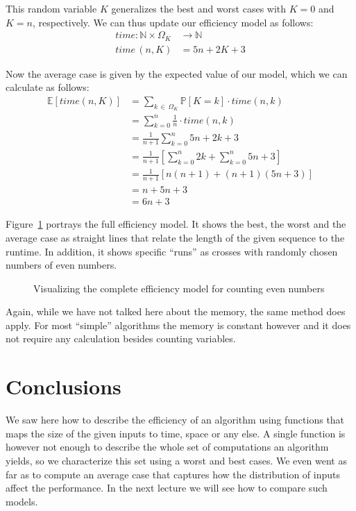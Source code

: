 \documentclass{aldast}
\begin{document}
This random variable $K$ generalizes the best and worst cases with $K=0$
and $K=n$, respectively. We can thus update our efficiency model as
follows:
\begin{align*}
  time: \mathbb{N} \times \Omega_K & \to \mathbb{N} \\
  time\,(n, K) & = 5n + 2K + 3 
\end{align*}

Now the average case is given by the expected value of our model,
which we can calculate as follows:
\begin{align*}
  \mathbb{E}[time(n, K)] & = \sum_{k \, \in \, \Omega_K} \mathbb{P}[K=k] \cdot time(n, k)  \\
                         & = \sum_{k=0}^n \frac{1}{n} \cdot time(n, k) \\
                         & = \frac{1}{n+1} \sum_{k=0}^{n} 5n + 2k + 3 \\
                         & = \frac{1}{n+1} \left[ \sum_{k=0}^{n} 2k + \sum_{k=0}^n 5n + 3 \right] \\
                         & = \frac{1}{n+1} \left[ n (n+1)  +  (n+1) (5n + 3) \right] \\
                         & = n + 5 n + 3 \\
                         & = 6n + 3
\end{align*}

Figure~\ref{plot:even-count-full} portrays the full efficiency
model. It shows the best, the worst and the average case as straight
lines that relate the length of the given sequence to the runtime. In
addition, it shows specific ``runs'' as crosses with randomly chosen
numbers of even numbers.

\begin{figure}[htbp]
  \begin{center}
    
  \end{center}
  \caption{Visualizing the complete efficiency model for counting even numbers}
  \label{plot:even-count-full}
\end{figure}

Again, while we have not talked here about the memory, the same method
does apply. For most ``simple'' algorithms the memory is constant
however and it does not require any calculation besides counting
variables.

\section*{Conclusions}

We saw here how to describe the efficiency of an algorithm using
functions that maps the size of the given inputs to time, space or any
else. A single function is however not enough to describe the
whole set of computations an algorithm yields, so we characterize
this set using a worst and best cases. We even went as far as to
compute an average case that captures how the distribution of inputs
affect the performance. In the next lecture we will see how to compare
such models.



\end{document}

